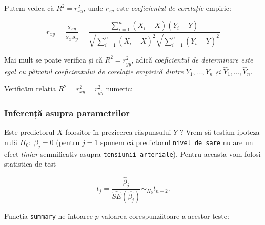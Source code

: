 \documentclass[]{article}
\newenvironment{Shaded}{\begin{snugshade}}{\end{snugshade}}
\newcommand{\KeywordTok}[1]{\textcolor[rgb]{0.13,0.29,0.53}{\textbf{#1}}}
\newcommand{\DecValTok}[1]{\textcolor[rgb]{0.00,0.00,0.81}{#1}}
\newcommand{\FloatTok}[1]{\textcolor[rgb]{0.00,0.00,0.81}{#1}}
\newcommand{\StringTok}[1]{\textcolor[rgb]{0.31,0.60,0.02}{#1}}
\newcommand{\CommentTok}[1]{\textcolor[rgb]{0.56,0.35,0.01}{\textit{#1}}}
\newcommand{\OperatorTok}[1]{\textcolor[rgb]{0.81,0.36,0.00}{\textbf{#1}}}
\newcommand{\NormalTok}[1]{#1}
\begin{document}
Putem vedea că \(R^2=r_{xy}^2\), unde \(r_{xy}\) este \emph{coeficientul
de corelație} empiric:

\[
r_{xy}=\frac{s_{xy}}{s_xs_y}=\frac{\sum_{i=1}^n \left(X_i-\bar X \right)\left(Y_i-\bar Y \right)}{\sqrt{\sum_{i=1}^n \left(X_i-\bar X \right)^2}\sqrt{\sum_{i=1}^n \left(Y_i-\bar Y \right)^2}}
\]

Mai mult se poate verifica și că \(R^2=r^2_{y\hat y}\), adică
\emph{coeficientul de determinare este egal cu pătratul coeficientului
de corelație empirică dintre \(Y_1,\ldots,Y_n\) și
\(\hat Y_1,\ldots,\hat Y_n\)}.

Verificăm relația \(R^2=r^2_{xy}=r^2_{y\hat y}\) numeric:

\begin{Shaded}
\end{Shaded}

\subsubsection{Inferență asupra
parametrilor}\label{inferenta-asupra-parametrilor}

Este predictorul \(X\) folositor în prezicerea răspunsului \(Y\) ? Vrem
să testăm ipoteza nulă \(H_0:\;\beta_j=0\) (pentru \(j=1\) spunem că
predictorul \texttt{nivel\ de\ sare} nu are un efect \emph{liniar}
semnificativ asupra \texttt{tensiunii\ arteriale}). Pentru aceasta vom
folosi statistica de test

\[
t_j = \frac{\hat{\beta}_j}{\hat{SE}(\hat{\beta_j})}\sim_{H_0} t_{n-2}.
\]

Funcția \texttt{summary} ne întoarce \(p\)-valoarea corespunzătoare a
acestor teste:
\end{document}
